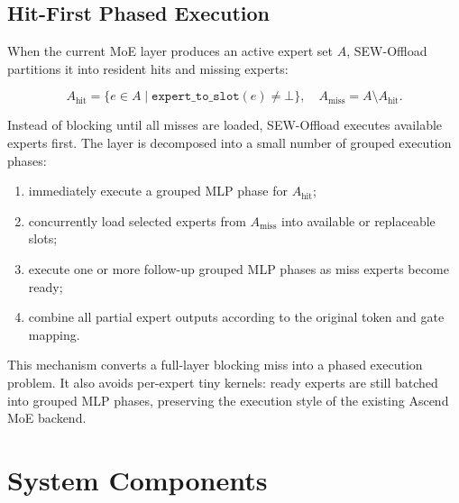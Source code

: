 \documentclass[10pt]{article}
\begin{document}
\subsection{Hit-First Phased Execution}

When the current MoE layer produces an active expert set $A$, SEW-Offload
partitions it into resident hits and missing experts:

\[
A_{\text{hit}} = \{e \in A \mid \texttt{expert\_to\_slot}(e) \neq \bot\},
\quad
A_{\text{miss}} = A \setminus A_{\text{hit}}.
\]

Instead of blocking until all misses are loaded, SEW-Offload executes available
experts first. The layer is decomposed into a small number of grouped execution
phases:

\begin{enumerate}[leftmargin=*]
  \item immediately execute a grouped MLP phase for $A_{\text{hit}}$;
  \item concurrently load selected experts from $A_{\text{miss}}$ into
  available or replaceable slots;
  \item execute one or more follow-up grouped MLP phases as miss experts become
  ready;
  \item combine all partial expert outputs according to the original token and
  gate mapping.
\end{enumerate}

This mechanism converts a full-layer blocking miss into a phased execution
problem. It also avoids per-expert tiny kernels: ready experts are still batched
into grouped MLP phases, preserving the execution style of the existing Ascend
MoE backend.

\section{System Components}
\end{document}

